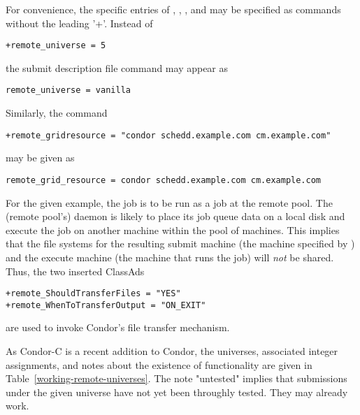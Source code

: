 For convenience, the specific entries of 
, 
, 
, and
may be specified as  commands
without the leading '+'. 
Instead of 
\footnotesize
\begin{verbatim}
+remote_universe = 5
\end{verbatim}
\normalsize

the submit description file command may appear as

\footnotesize
\begin{verbatim}
remote_universe = vanilla
\end{verbatim}
\normalsize

Similarly, the command
\footnotesize
\begin{verbatim}
+remote_gridresource = "condor schedd.example.com cm.example.com"
\end{verbatim}
\normalsize

may be given as

\footnotesize
\begin{verbatim}
remote_grid_resource = condor schedd.example.com cm.example.com
\end{verbatim}
\normalsize

For the given example,
the job is to be run as a  
 job at the remote pool.
The (remote pool's)  daemon is likely to
place its job queue data on a local disk 
and execute the job on another machine within the pool of machines.
This implies that the file systems for the resulting submit machine
(the machine specified by ) and
the execute machine (the machine that runs the job) will
\emph{not} be shared.
Thus,
the two inserted ClassAds
\footnotesize
\begin{verbatim}
+remote_ShouldTransferFiles = "YES"
+remote_WhenToTransferOutput = "ON_EXIT"
\end{verbatim}
\normalsize
are used to invoke Condor's file transfer mechanism. 



As Condor-C is a recent addition to Condor,
the universes, associated integer assignments,
and notes about the existence of functionality are given in 
Table~\ref{working-remote-universes}.
The note "untested" implies that
submissions under the given universe have not yet
been throughly tested.
They may already work.

